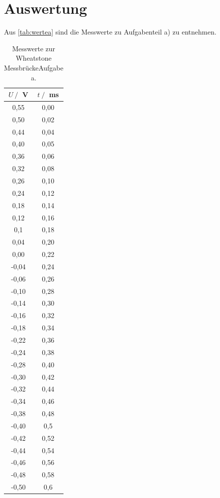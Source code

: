 \section{Auswertung}
\label{sec:Auswertung}

Aus \autoref{tab:wertea} sind die Messwerte zu Aufgabenteil a) zu entnehmen.
\begin{table}[H]
    \centering
    \caption{Messwerte zur Wheatstone MessbrückeAufgabe a.}
    \label{tab:wertea}
    \begin{tabular}{c c}
        \toprule
        $U \:/\:$ V & $t \:/\:$ ms \\
        \midrule
        0,55 & 0,00 \\
        0,50 & 0,02 \\
        0,44 & 0,04 \\
        0,40 & 0,05 \\
        0,36 & 0,06 \\
        0,32 & 0,08 \\
        0,26 & 0,10 \\
        0,24 & 0,12 \\
        0,18 & 0,14 \\
        0,12 & 0,16 \\
        0,1 & 0,18 \\
        0,04 & 0,20 \\
        0,00 & 0,22 \\
        -0,04 & 0,24 \\
        -0,06 & 0,26 \\
        -0,10 & 0,28 \\
        -0,14 & 0,30 \\
        -0,16 & 0,32 \\
        -0,18 & 0,34 \\
        -0,22 & 0,36 \\
        -0,24 & 0,38 \\
        -0,28 & 0,40 \\
        -0,30 & 0,42 \\
        -0,32 & 0,44 \\
        -0,34 & 0,46 \\
        -0,38 & 0,48 \\
        -0,40 & 0,5 \\
        -0,42 & 0,52 \\
        -0,44 & 0,54 \\
        -0,46 & 0,56 \\
        -0,48 & 0,58 \\
        -0,50 & 0,6 \\
        \bottomrule
    \end{tabular}
\end{table}

